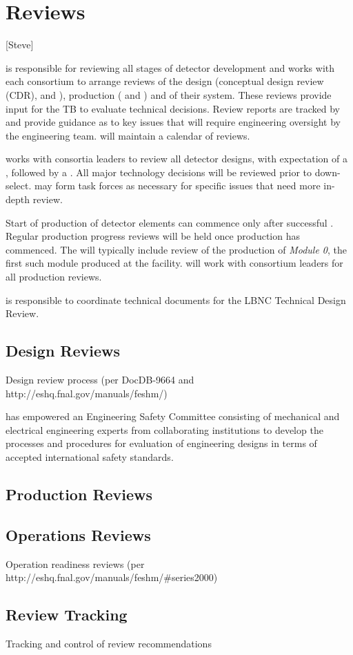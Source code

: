 \chapter{Reviews}
\label{vl:tc-review}

[Steve]

 is responsible for reviewing all stages of detector
development and works with each consortium to arrange reviews of the
design (conceptual design review (CDR),  and ),
production ( and ) and  of their
system.  These reviews provide input for the TB to evaluate technical
decisions.  Review reports are tracked by  and provide
guidance as to key issues that will require engineering oversight by
the  engineering team.  will maintain a calendar
of  reviews.

 works with consortia leaders to review all detector designs,
with expectation of a , followed by a .  All
major technology decisions will be reviewed prior to down-select.  
may form task forces as necessary for specific issues that need more
in-depth review.


Start of production of detector elements can commence only after
successful . Regular production progress
reviews will be held once production has commenced. The 
will typically include review of the production of \textit{Module 0}, the
first such module produced at the facility.  will work with
consortium leaders for all production reviews.

 is responsible to coordinate technical documents for the LBNC
Technical Design Review.

\section{Design Reviews}

Design review process (per DocDB-9664 and http://eshq.fnal.gov/manuals/feshm/)

 has empowered an Engineering Safety Committee consisting of
mechanical and electrical engineering experts from collaborating
institutions to develop the processes and procedures for evaluation of
engineering designs in terms of accepted international safety
standards.

\section{Production Reviews}

\section{Operations Reviews}

Operation readiness reviews (per http://eshq.fnal.gov/manuals/feshm/\#series2000)

\section{Review Tracking}

Tracking and control of review recommendations

